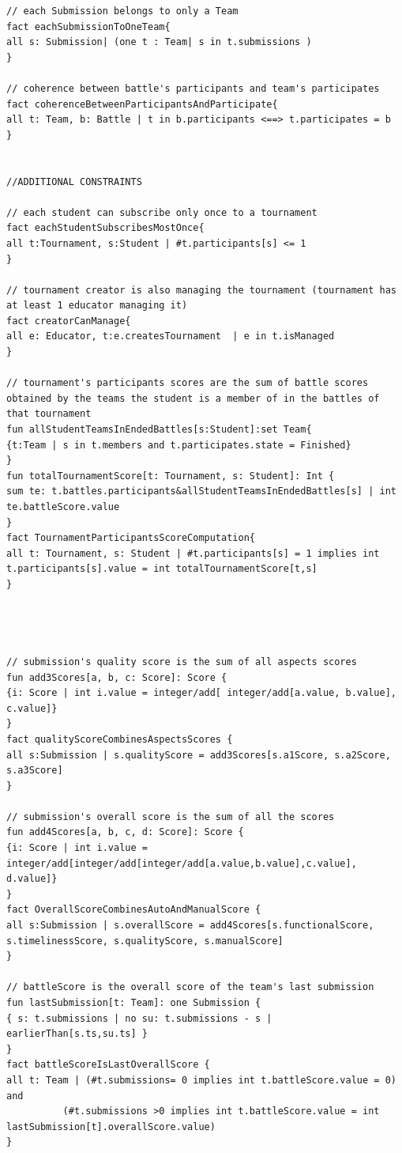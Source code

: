 \begin{lstlisting}[language=alloy]
// each Submission belongs to only a Team
fact eachSubmissionToOneTeam{
all s: Submission| (one t : Team| s in t.submissions )
}

// coherence between battle's participants and team's participates
fact coherenceBetweenParticipantsAndParticipate{
all t: Team, b: Battle | t in b.participants <==> t.participates = b
}


//ADDITIONAL CONSTRAINTS

// each student can subscribe only once to a tournament
fact eachStudentSubscribesMostOnce{
all t:Tournament, s:Student | #t.participants[s] <= 1
}

// tournament creator is also managing the tournament (tournament has at least 1 educator managing it)
fact creatorCanManage{ 
all e: Educator, t:e.createsTournament  | e in t.isManaged 
}

// tournament's participants scores are the sum of battle scores obtained by the teams the student is a member of in the battles of that tournament
fun allStudentTeamsInEndedBattles[s:Student]:set Team{
{t:Team | s in t.members and t.participates.state = Finished}
}
fun totalTournamentScore[t: Tournament, s: Student]: Int {
sum te: t.battles.participants&allStudentTeamsInEndedBattles[s] | int te.battleScore.value
}
fact TournamentParticipantsScoreComputation{ 
all t: Tournament, s: Student | #t.participants[s] = 1 implies int t.participants[s].value = int totalTournamentScore[t,s]
}




// submission's quality score is the sum of all aspects scores
fun add3Scores[a, b, c: Score]: Score {
{i: Score | int i.value = integer/add[ integer/add[a.value, b.value], c.value]}
}
fact qualityScoreCombinesAspectsScores {
all s:Submission | s.qualityScore = add3Scores[s.a1Score, s.a2Score, s.a3Score] 
}

// submission's overall score is the sum of all the scores
fun add4Scores[a, b, c, d: Score]: Score {
{i: Score | int i.value = integer/add[integer/add[integer/add[a.value,b.value],c.value], d.value]}
}
fact OverallScoreCombinesAutoAndManualScore {
all s:Submission | s.overallScore = add4Scores[s.functionalScore, s.timelinessScore, s.qualityScore, s.manualScore]
}

// battleScore is the overall score of the team's last submission
fun lastSubmission[t: Team]: one Submission {
{ s: t.submissions | no su: t.submissions - s | earlierThan[s.ts,su.ts] }
}
fact battleScoreIsLastOverallScore {
all t: Team | (#t.submissions= 0 implies int t.battleScore.value = 0) and
	      (#t.submissions >0 implies int t.battleScore.value = int lastSubmission[t].overallScore.value)
}


\end{lstlisting}
